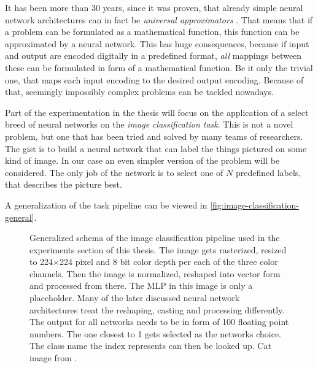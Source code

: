 It has been more than 30 years, since it was proven, that already simple neural network architectures can in fact be \emph{universal approximators} \cite{ffnUnversalApproximator}. 
That means that if a problem can be formulated as a mathematical function, this function can be approximated by a neural network.
This has huge consequences, because if input and output are encoded digitally in a predefined format, \emph{all} mappings between these can be formulated in form of a mathematical function. 
Be it only the trivial one, that maps each input encoding to the desired output encoding.
Because of that, seemingly impossibly complex problems can be tackled nowadays. 

Part of the experimentation in the thesis will focus on the application of a select breed of neural networks on the \emph{image classification task}.
This is not a novel problem, but one that has been tried and solved by many teams of researchers. 
The gist is to build a neural network that can label the things pictured on some kind of image.
In our case an even simpler version of the problem will be considered. 
The only job of the network is to select one of $N$ predefined labels, that describes the picture best.

A generalization of the task pipeline can be viewed in \autoref{fig:image-classification-general}.

\begin{figure}[htbp]
    \centering
    \caption{Generalized schema of the image classification pipeline used in the experiments section of this thesis.
        The image gets rasterized, resized to 224$\times$224 pixel and 8 bit color depth per each of the three color channels. Then the image is normalized, reshaped into vector form and processed from there. The MLP in this image is only a placeholder. Many of the later discussed neural network architectures treat the reshaping, casting and processing differently. The output for all networks needs to be in form of 100 floating point numbers. The one closest to 1 gets selected as the networks choice. The class name the index represents can then be looked up.
        Cat image from \cite{catPhoto}.
    }
    \label{fig:image-classification-general}
\end{figure}

